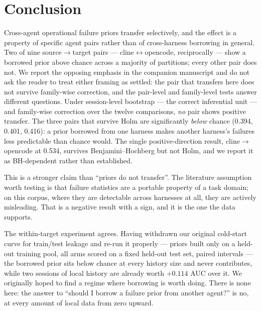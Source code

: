 \documentclass[11pt]{article}
\begin{document}
\section{Conclusion}

Cross-agent operational failure priors transfer selectively, and the effect
is a property of specific agent pairs rather than of cross-harness borrowing in
general. Two of nine source$\to$target pairs --- cline$\leftrightarrow$opencode,
reciprocally --- show a borrowed prior above chance across a majority of
partitions; every other pair does not. We report the opposing emphasis in the
companion manuscript and do not ask the reader to treat either framing as
settled: the pair that transfers here does not survive family-wise correction,
and the pair-level and family-level tests answer different questions. Under
session-level bootstrap --- the correct inferential unit --- and family-wise
correction over the twelve comparisons, \emph{no} pair shows positive
transfer. The three pairs that survive Holm are significantly \emph{below}
chance (0.394, 0.401, 0.416): a prior borrowed from one harness makes
another harness's failures less predictable than chance would. The single
positive-direction result, cline$\to$opencode at 0.534, survives
Benjamini--Hochberg but not Holm, and we report it as BH-dependent rather
than established.

This is a stronger claim than ``priors do not transfer''. The literature
assumption worth testing is that failure statistics are a portable property
of a task domain; on this corpus, where they are detectable across harnesses
at all, they are actively misleading. That is a negative result with a
sign, and it is the one the data supports.

The within-target experiment agrees. Having withdrawn our original cold-start
curve for train/test leakage and re-run it properly --- priors built only on
a held-out training pool, all arms scored on a fixed held-out test set,
paired intervals --- the borrowed prior sits below chance at every history
size and never contributes, while two sessions of local history are already
worth $+0.114$ AUC over it. We originally hoped to find a regime where
borrowing is worth doing. There is none here: the answer to ``should I
borrow a failure prior from another agent?'' is no, at every amount of local
data from zero upward.
\end{document}
